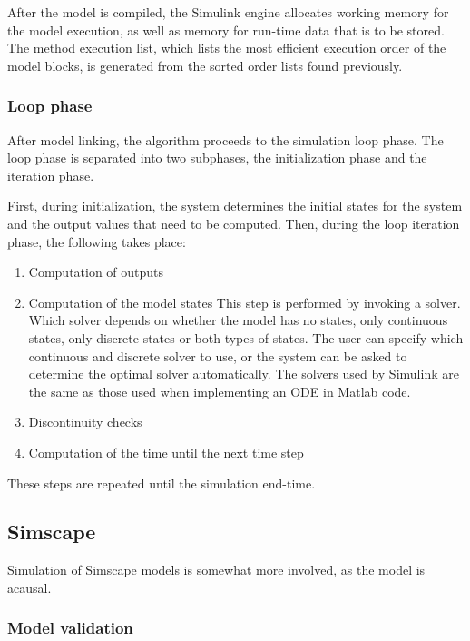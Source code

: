 \documentclass[\rootfolder/main.tex]{subfiles}
\begin{document}
After the model is compiled, the Simulink engine allocates working memory for the model execution, as well as memory for run-time data that is to be stored.
The method execution list, which lists the most efficient execution order of the model blocks, is generated from the sorted order lists found previously.

\subsubsection{Loop phase}

After model linking, the algorithm proceeds to the simulation loop phase.
The loop phase is separated into two subphases, the initialization phase and the iteration phase.

First, during initialization, the system determines the initial states for the system and the output values that need to be computed.
Then, during the loop iteration phase, the following takes place:

\begin{enumerate}
    \item Computation of outputs
    \item Computation of the model states
        This step is performed by invoking a solver.
        Which solver depends on whether the model has no states, only continuous states, only discrete states or both types of states.
        The user can specify which continuous and discrete solver to use, or the system can be asked to determine the optimal solver automatically.
        The solvers used by Simulink are the same as those used when implementing an ODE in Matlab code.
    \item Discontinuity checks
    \item Computation of the time until the next time step
\end{enumerate}

These steps are repeated until the simulation end-time.

\subsection{Simscape}

Simulation of Simscape models is somewhat more involved, as the model is acausal.

\subsubsection{Model validation}
\end{document}
